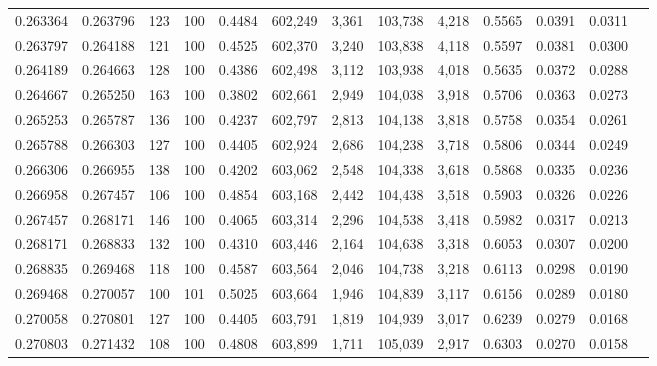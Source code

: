 \begin{tabular}{rrrrrrrrrrrrr}
0.263364 & 0.263796 &   123 & 100 &                                     0.4484 & 602,249 &   3,361 & 103,738 &   4,218 & 0.5565 & 0.0391 & 0.0311 \\
0.263797 & 0.264188 &   121 & 100 &                                     0.4525 & 602,370 &   3,240 & 103,838 &   4,118 & 0.5597 & 0.0381 & 0.0300 \\
0.264189 & 0.264663 &   128 & 100 &                                     0.4386 & 602,498 &   3,112 & 103,938 &   4,018 & 0.5635 & 0.0372 & 0.0288 \\
0.264667 & 0.265250 &   163 & 100 &                                     0.3802 & 602,661 &   2,949 & 104,038 &   3,918 & 0.5706 & 0.0363 & 0.0273 \\
0.265253 & 0.265787 &   136 & 100 &                                     0.4237 & 602,797 &   2,813 & 104,138 &   3,818 & 0.5758 & 0.0354 & 0.0261 \\
0.265788 & 0.266303 &   127 & 100 &                                     0.4405 & 602,924 &   2,686 & 104,238 &   3,718 & 0.5806 & 0.0344 & 0.0249 \\
0.266306 & 0.266955 &   138 & 100 &                                     0.4202 & 603,062 &   2,548 & 104,338 &   3,618 & 0.5868 & 0.0335 & 0.0236 \\
0.266958 & 0.267457 &   106 & 100 &                                     0.4854 & 603,168 &   2,442 & 104,438 &   3,518 & 0.5903 & 0.0326 & 0.0226 \\
0.267457 & 0.268171 &   146 & 100 &                                     0.4065 & 603,314 &   2,296 & 104,538 &   3,418 & 0.5982 & 0.0317 & 0.0213 \\
0.268171 & 0.268833 &   132 & 100 &                                     0.4310 & 603,446 &   2,164 & 104,638 &   3,318 & 0.6053 & 0.0307 & 0.0200 \\
0.268835 & 0.269468 &   118 & 100 &                                     0.4587 & 603,564 &   2,046 & 104,738 &   3,218 & 0.6113 & 0.0298 & 0.0190 \\
0.269468 & 0.270057 &   100 & 101 &                                     0.5025 & 603,664 &   1,946 & 104,839 &   3,117 & 0.6156 & 0.0289 & 0.0180 \\
0.270058 & 0.270801 &   127 & 100 &                                     0.4405 & 603,791 &   1,819 & 104,939 &   3,017 & 0.6239 & 0.0279 & 0.0168 \\
0.270803 & 0.271432 &   108 & 100 &                                     0.4808 & 603,899 &   1,711 & 105,039 &   2,917 & 0.6303 & 0.0270 & 0.0158 \\

\end{tabular}
